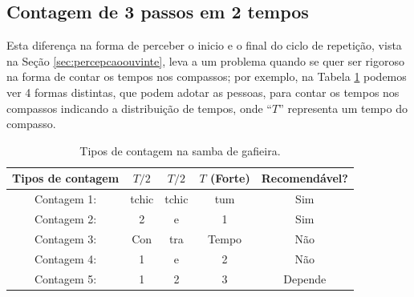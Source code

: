 \subsection{Contagem de 3 passos em 2 tempos}
Esta diferença na forma de perceber o inicio e o final do ciclo de repetição,
vista na Seção \ref{sec:percepcaoouvinte}, 
leva a um problema quando se quer ser rigoroso na forma de contar os tempos nos compassos; 
por exemplo, na Tabela \ref{tab:ritmo1} 
podemos ver 4 formas distintas, que podem adotar as pessoas, 
para contar os tempos nos compassos indicando a distribuição de tempos, 
onde ``$T$'' representa um tempo do compasso.
\begin{table}[ht]
  \centering
  \begin{tabular}    {c|ccc|c}
    \hline
    Tipos de contagem       & $T/2$ & $T/2$   & $T$ (Forte) & Recomendável?\\
    \hline
    Contagem 1: & tchic  & tchic  & tum   & Sim\\
    Contagem 2: & 2     & e     & 1     & Sim\\ \hline
    Contagem 3: & Con   & tra  & Tempo & Não\\
    Contagem 4: & 1     & e     & 2     & Não\\  \hline
    Contagem 5: & 1     & 2     & 3     & Depende\\ \hline
    \hline
  \end{tabular}
  \caption{Tipos de contagem na samba de gafieira.}
\label{tab:ritmo1}
\end{table}

